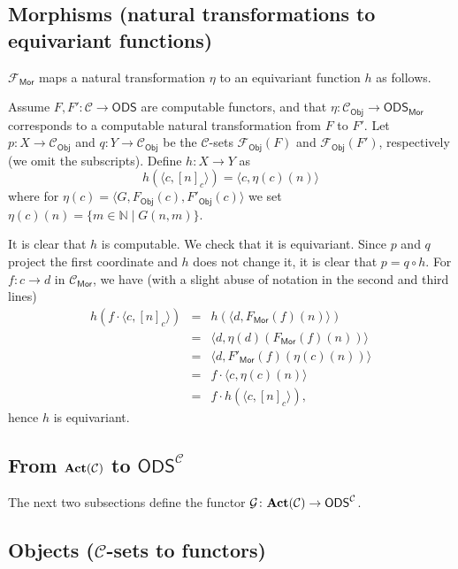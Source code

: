 \documentclass[envcountsame]{llncs}
\def\IN{{\mathbb N}}
\def\calC{{\mathcal{C}}}
\def\calF{{\mathcal{F}}}
\def\calG{{\mathcal{G}}}
\newcommand{\cntSets}{{\mathsf{ODS}}}
\newcommand{\Mor}{\mathsf{Mor}}
\newcommand{\Obj}{\mathsf{Obj}}
\def\act{{\mathrm{\bold{Act}}}}
\begin{document}
\subsection*{Morphisms (natural transformations to equivariant functions)}

$\calF_\Mor$ maps a natural transformation $\eta$ to an equivariant function $h$ as follows. 

Assume $F,F'\colon \calC \to\cntSets$ are computable functors, and that $\eta\colon \calC_\Obj \to \cntSets_\Mor$ corresponds to a computable natural transformation from $F$ to $F'$. Let $p\colon X \to \calC_\Obj$ and $q\colon Y \to \calC_\Obj$ be the $\calC$-sets $\calF_\Obj(F)$ and $\calF_\Obj(F')$, respectively (we omit the subscripts). Define $h\colon X\to Y$ as 
\[h(\langle c, [n]_c \rangle) = \langle c, \eta(c)(n) \rangle\]
where for $\eta(c) = \langle G, F_\Obj(c), F'_\Obj(c)\rangle$ we set $\eta(c)(n)=\{m\in\IN \mid G(n,m)\}$.

It is clear that $h$ is computable. We check that it is equivariant. Since $p$ and $q$ project the first coordinate and $h$ does not change it, it is clear that $p=q\circ h$. For $f\colon c\to d$ in $\calC_\Mor$, we have (with a slight abuse of notation in the second and third lines)
\begin{eqnarray*}
h(f\cdot \langle c, [n]_c \rangle) &=& h(\langle d, F_\Mor(f)(n)\rangle)\\
 &=& \langle d, \eta(d)(F_\Mor(f)(n))\rangle\\
  &=& \langle d, F'_\Mor(f)(\eta(c)(n))\rangle\\
   &=& f\cdot\langle c, \eta(c)(n)\rangle\\
  &=& f\cdot h(\langle c, [n]_c \rangle),
\end{eqnarray*}
hence $h$ is equivariant.



\subsection{From $\act(\calC)$ to $\cntSets^\calC$}\label{subsec:espace2functor}

The next two subsections define the functor  $\calG\colon \act(\calC) \to \cntSets^\calC$.

\subsection*{Objects ($\calC$-sets to functors)}
\end{document}
